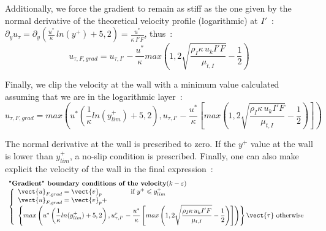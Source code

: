 Additionally, we force the gradient to remain as stiff as the one 
given by the normal derivative of the theoretical velocity profile
(logarithmic) at $I'$~:\\
$\partial_y u_{\tau} = \partial_y (\displaystyle
\frac{u^*}{\kappa}\,ln{ (y^+)} + 5,2 ) =\displaystyle\frac{u^*}{\kappa\, \overline{I'F}}$, thus~:
\begin{equation}
u_{\tau,F,grad} =u_{\tau,I'}-\displaystyle\frac{u^*}{\kappa}max\left(1,
2\sqrt{\displaystyle\frac{\rho_I\kappa\, u_k I'F}{\mu_{t,I}} }-\displaystyle\frac{1}{2}\right)
\end{equation}

Finally, we clip the velocity at the wall with a minimum value calculated 
assuming that we are in the logarithmic layer~:
\begin{equation}\label{Base_Clptur_eq_ugrad_clptur}
u_{\tau,F,grad} =
max\left(u^*\left(\displaystyle\frac{1}{\kappa}ln(y^+_{lim})+5,2\right),
u_{\tau,I'}-\displaystyle\frac{u^*}{\kappa}\left[max\left(1,
2\sqrt{\displaystyle\frac{\rho_I\kappa\, u_k I'F}{\mu_{t,I}}
}-\displaystyle\frac{1}{2}\right)\right]\right)
\end{equation}


The normal derivative at the wall is prescribed to zero.
If the $y^+$ value at the wall is lower than  $y^+_{lim}$, 
a no-slip condition is prescribed. Finally, one can also 
make explicit the velocity of the wall in the final expression~:
\begin{equation}
\begin{array}{l}
\text{\bf "Gradient" boundary conditions of the velocity} (k-\varepsilon)\\
\left\{\begin{array}{l}
\vect{u}_{F,grad}=\vect{v}_p
          \qquad\qquad\text{ if }  y^+\leqslant y^+_{lim} \\
\vect{u}_{F,grad}=\vect{v}_p+\\
          \left\{
max\left(u^*\left(\displaystyle\frac{1}{\kappa}ln(y^+_{lim})+5,2\right),
u^r_{\tau,I'}-\displaystyle\frac{u^*}{\kappa}\left[max\left(1,
2\sqrt{\displaystyle\frac{\rho_I\kappa\, u_k I'F}{\mu_{t,I}}
}-\displaystyle\frac{1}{2}\right)\right]\right)
\right\}\vect{\tau}
          \text{ otherwise }
\end{array}\right.
\end{array}
\end{equation}

